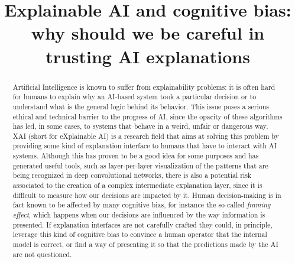 \documentclass[conference]{IEEEtran}
\begin{document}
\title{Explainable AI and cognitive bias: why should we be careful in trusting AI explanations}


\author{
    }

\maketitle

\begin{abstract}
    Artificial Intelligence is known to suffer from explainability problems:
    it is often hard for humans to explain why an AI-based system took a
    particular decision or to understand what is the general logic behind its
    behavior.
    This issue poses a serious ethical and technical barrier to the progress
    of AI, since the opacity of these algorithms has led, in some cases, to  systems that behave in a weird, unfair or dangerous way.
    XAI (short for eXplainable AI) is a research field
    that aims at solving this problem by providing some kind of explanation
    interface to humans that have to interact with AI systems.
    Although this has proven to be a good idea for some purposes and has generated useful tools, such as layer-per-layer visualization of the patterns that are being recognized in deep convolutional networks, there is also a potential risk associated to the creation of a complex intermediate explanation layer, since it is difficult to measure how our decisions are impacted by it. Human
    decision-making is in fact known to be affected by many cognitive bias, for instance the so-called \textit{framing effect}, which happens when our
    decisions are influenced by the way information is presented.
    If explanation interfaces are not carefully crafted they could, in principle, leverage this kind of cognitive bias to convince a human operator that the internal model is correct, or find a way of presenting it so that the predictions made by the AI are not questioned.

\end{abstract}
\end{document}
